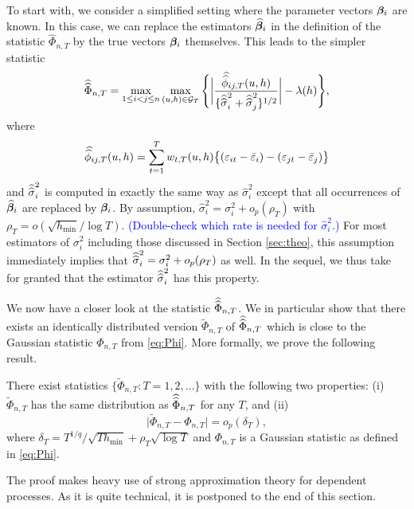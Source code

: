 To start with, we consider a simplified setting where the parameter vectors $\bm{\beta}_i$ are known. In this case, we can replace the estimators $\widehat{\bm{\beta}}_i$ in the definition of the statistic $\widehat{\Phi}_{n,T}$ by the true vectors $\bm{\beta}_i$ themselves. This leads to the simpler statistic 
\[ \doublehattwo{\Phi}_{n,T} = \max_{1 \le i < j \le n} \max_{(u,h) \in \mathcal{G}_T}\Bigg\{ \bigg| \frac{\doublehat{\phi}_{ij,T}(u,h)} {\{ \doublehattwo{\sigma}_i^2 + \doublehattwo{\sigma}_j^2 \}^{1/2}} \bigg| - \lambda(h)\Bigg\}, \]
where
\[ \doublehat{\phi}_{ij,T}(u,h) = \sum_{t=1}^T w_{t,T}(u,h) \big\{ (\varepsilon_{it} - \bar{\varepsilon}_i) - (\varepsilon_{jt} - \bar{\varepsilon}_j)  \big\} \]
and $\widehat{\widehat{\sigma}}_i^2$ is computed in exactly the same way as $\widehat{\sigma}_i^2$ except that all occurrences of $\widehat{\bm{\beta}}_i$ are replaced by $\bm{\beta}_i$. By assumption, $\widehat{\sigma}_i^2 = \sigma^2_i + o_p(\rho_T)$ with $\rho_T = o(\sqrt{h_{\min}}/\log T)$. \textcolor{blue}{(Double-check which rate is needed for $\widehat{\sigma}_i^2$.)} For most estimators of $\sigma_i^2$ including those discussed in Section \ref{sec:theo}, this assumption immediately implies that $\widehat{\widehat{\sigma}}_i^2 = \sigma^2_i + o_p(\rho_T)$ as well. In the sequel, we thus take for granted that the estimator $\widehat{\widehat{\sigma}}_i^2$ has this property.


We now have a closer look at the statistic $\widehat{\widehat{\Phi}}_{n,T}$. We in particular show that there exists an identically distributed version $\widetilde{\Phi}_{n, T}$ of $\widehat{\widehat{\Phi}}_{n, T}$ which is close to the Gaussian statistic $\Phi_{n, T}$ from \eqref{eq:Phi}. More formally, we prove the following result.  
\begin{propA}\label{propA:strong_approx}
There exist statistics $\{ \widetilde{\Phi}_{n,T}: T =1,2,\ldots \}$ with the following two properties: (i) $\widetilde{\Phi}_{n, T}$ has the same distribution as $\widehat{\widehat{\Phi}}_{n, T}$ for any $T$, and (ii)
\begin{equation*}
\big| \widetilde{\Phi}_{n, T} - \Phi_{n,T} \big| = o_p(\delta_T),
\end{equation*}
where $\delta_T = T^{1/q} / \sqrt{T h_{\min}} + \rho_T \sqrt{\log T}$ and $\Phi_{n,T}$ is a Gaussian statistic as defined in \eqref{eq:Phi}. 
\end{propA}
The proof makes heavy use of strong approximation theory for dependent processes. As it is quite technical, it is postponed to the end of this section. 


